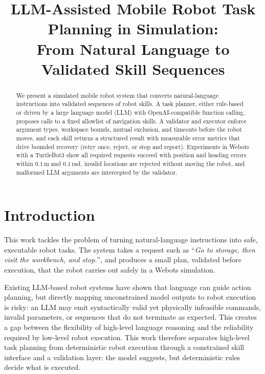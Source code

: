 \documentclass[conference]{IEEEtran}
\title{LLM-Assisted Mobile Robot Task Planning in Simulation:\\
       From Natural Language to Validated Skill Sequences}
\author{\IEEEauthorblockN{Ruijie Zhu}
\IEEEauthorblockA{Department of Electromechanical Engineering\\
University of Macau, Macau, China\\
Email: mc65809@um.edu.mo}
}
\begin{document}
\maketitle

\begin{abstract}
We present a simulated mobile robot system that converts natural-language
instructions into validated sequences of robot skills. A task planner, either
rule-based or driven by a large language model (LLM) with OpenAI-compatible
function calling, proposes calls to a fixed allowlist of navigation skills.
A validator and executor enforce argument types, workspace bounds, mutual
exclusion, and timeouts before the robot moves, and each skill returns a
structured result with measurable error metrics that drive bounded recovery
(retry once, reject, or stop and report). Experiments in Webots with a
TurtleBot3 show all required requests succeed with position and heading
errors within $0.1$\,m and $0.1$\,rad, invalid locations are rejected without
moving the robot, and malformed LLM arguments are intercepted by the
validator.
\end{abstract}

\section{Introduction}
This work tackles the problem of turning natural-language instructions into
safe, executable robot tasks. The system takes a request such as
``\emph{Go to storage, then visit the workbench, and stop.}'',
and produces a small plan, validated before execution, that the robot
carries out safely in a Webots simulation.

Existing LLM-based robot systems have shown that language can guide
action planning, but directly mapping unconstrained model outputs to robot
execution is risky: an LLM may emit syntactically valid yet physically
infeasible commands, invalid parameters, or sequences that do not terminate
as expected. This creates a gap between the flexibility of high-level
language reasoning and the reliability required by low-level robot
execution. This work therefore separates high-level task planning from
deterministic robot execution through a constrained skill interface and a
validation layer: the model suggests, but deterministic rules decide what is
executed.
\end{document}
